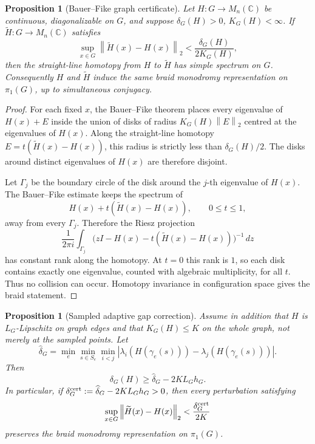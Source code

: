 \documentclass[11pt]{article}
\newtheorem{proposition}[theorem]{Proposition}
\numberwithin{equation}{section}
\newcommand{\bbC}{\mathbb C}
\newcommand{\norm}[1]{\left\|#1\right\|}
\newcommand{\wt}[1]{\widetilde{#1}}
\begin{document}
\begin{proposition}[Bauer--Fike graph certificate]\label{prop:BF-graph}
Let \(H:G\to M_n(\bbC)\) be continuous, diagonalizable on \(G\), and suppose
\(\delta_G(H)>0\), \(K_G(H)<\infty\).  If \(\wt H:G\to M_n(\bbC)\) satisfies
\[
  \sup_{x\in G}\norm{\wt H(x)-H(x)}_2<\frac{\delta_G(H)}{2K_G(H)},
\]
then the straight-line homotopy from \(H\) to \(\wt H\) has simple spectrum
on \(G\).  Consequently \(H\) and \(\wt H\) induce the same braid monodromy
representation on \(\pi_1(G)\), up to simultaneous conjugacy.
\end{proposition}

\begin{proof}
For each fixed \(x\), the Bauer--Fike theorem \cite{HornJohnson2013}
places every eigenvalue of \(H(x)+E\) inside the union of disks of radius
\(K_G(H)\norm{E}_2\) centred at the eigenvalues of \(H(x)\).  Along the
straight-line homotopy \(E=t(\wt H(x)-H(x))\), this radius is strictly less
than \(\delta_G(H)/2\).  The disks around distinct eigenvalues of \(H(x)\)
are therefore disjoint.

Let \(\Gamma_j\) be the boundary circle of the disk around the \(j\)-th
eigenvalue of \(H(x)\).  The Bauer--Fike estimate keeps the spectrum of
\[
  H(x)+t(\wt H(x)-H(x)),\qquad 0\le t\le1,
\]
away from every \(\Gamma_j\).  Therefore the Riesz projection
\[
  \frac{1}{2\pi i}\int_{\Gamma_j}
  \bigl(zI-H(x)-t(\wt H(x)-H(x))\bigr)^{-1}\,dz
\]
has constant rank along the homotopy.  At \(t=0\) this rank is \(1\), so each
disk contains exactly one eigenvalue, counted with algebraic multiplicity, for
all \(t\).  Thus no collision can occur.  Homotopy invariance in configuration
space gives the braid statement.
\end{proof}

\begin{proposition}[Sampled adaptive gap correction]\label{prop:sampled-gap}
Assume in addition that \(H\) is \(L_G\)-Lipschitz on graph edges and that
\(K_G(H)\le K\) on the whole graph, not merely at the sampled points.  Let
\[
  \widehat\delta_G=\min_{e}\min_{s\in S_e}\min_{i<j}
  |\lambda_i(H(\gamma_e(s)))-\lambda_j(H(\gamma_e(s)))|.
\]
Then
\[
  \delta_G(H)\ge \widehat\delta_G-2KL_Gh_G.
\]
In particular, if \(\delta_G^{\rm cert}:=\widehat\delta_G-2KL_Gh_G>0\),
then every perturbation satisfying
\[
  \sup_{x\in G}\norm{\wt H(x)-H(x)}_2<\frac{\delta_G^{\rm cert}}{2K}
\]
preserves the braid monodromy representation on \(\pi_1(G)\).
\end{proposition}
\end{document}
